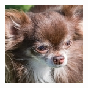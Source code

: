 \documentclass{report}
\begin{document}
\begin{figure}[h!]
\begin{subfigure}[t]{0.19\textwidth}
    \label{fig:dataset-sub4}
  \end{subfigure}
  \hfill
  \begin{subfigure}[t]{0.19\textwidth}
    \centering
    \includegraphics[width=\textwidth]{dataset/dog_4.jpg}
    \label{fig:dataset-sub5}
  \end{subfigure}


\end{figure}
\end{document}
